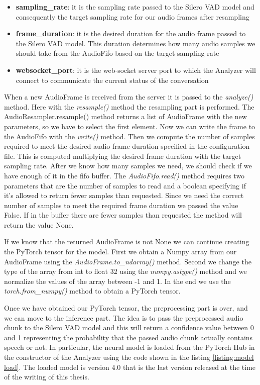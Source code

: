 \documentclass[../main.tex]{subfiles}
\begin{document}
\begin{itemize}
    \item \textbf{sampling\_rate}: it is the sampling rate passed to the Silero VAD model and consequently the target sampling rate for our audio frames after resampling 
    \item \textbf{frame\_duration}: it is the desired duration for the audio frame passed to the Silero VAD model. This duration determines how many audio samples we should take from the AudioFifo based on the target sampling rate
    \item \textbf{websocket\_port}: it is the web-socket server port to which the Analyzer will connect to communicate the current status of the conversation
\end{itemize}

When a new AudioFrame is received from the server it is passed to the \textit{analyze()} method. Here with the \textit{resample()} method the resampling part is performed. The AudioResampler.resample() method returns a list of AudioFrame with the new parameters, so we have to select the first element. Now we can write the frame to the AudioFifo with the \textit{write()} method. Then we compute the number of samples required to meet the desired audio frame duration specified in the configuration file. This is computed multiplying the desired frame duration with the target sampling rate. After we know how many samples we need, we should check if we have enough of it in the fifo buffer. The \textit{AudioFifo.read()} method requires two parameters that are the number of samples to read and a boolean specifying if it's allowed to return fewer samples than requested. Since we need the correct number of samples to meet the required frame duration we passed the value False. If in the buffer there are fewer samples than requested the method will return the value None. 

If we know that the returned AudioFrame is not None we can continue creating the PyTorch tensor for the model. First we obtain a Numpy array from our AudioFrame using the \textit{AudioFrame.to\_ndarray()} method. Second we change the type of the array from int to float 32 using the \textit{numpy.astype()} method and we normalize the values of the array between -1 and 1. In the end we use the \textit{torch.from\_numpy()} method to obtain a PyTorch tensor.

Once we have obtained our PyTorch tensor, the preprocessing part is over, and we can move to the inference part. The idea is to pass the preprocessed audio chunk to the Silero VAD model and this will return a confidence value between 0 and 1 representing the probability that the passed audio chunk actually contains speech or not. In particular, the neural model is loaded from the PyTorch Hub in the constructor of the Analyzer using the code shown in the listing \ref{listing:model load}. The loaded model is version 4.0 that is the last version released at the time of the writing of this thesis. 
\end{document}
